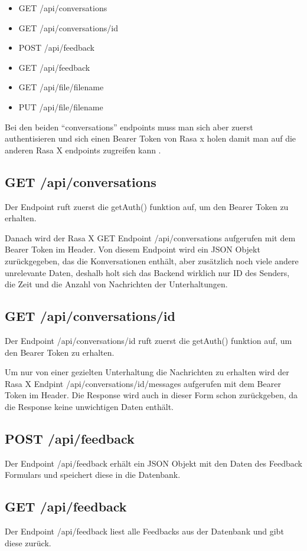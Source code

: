 \begin{itemize}
    \item GET /api/conversations
    \item GET /api/conversations/{id}
    \item POST /api/feedback
    \item GET /api/feedback
    \item GET /api/file/{filename}
    \item PUT /api/file/{filename}
\end{itemize}

Bei den beiden ``conversations'' endpoints muss man sich aber zuerst authentisieren und sich einen Bearer Token von Rasa x holen damit man auf die anderen Rasa X endpoints zugreifen kann .

\subsection{GET /api/conversations}
Der Endpoint ruft zuerst die getAuth() funktion auf, um den Bearer Token zu erhalten.

Danach wird der Rasa X GET Endpoint /api/conversations aufgerufen mit dem Bearer Token im Header.
Von diesem Endpoint wird ein JSON Objekt zurückgegeben, das die Konversationen enthält, aber zusätzlich noch viele andere unrelevante Daten, deshalb holt sich das Backend wirklich nur ID des Senders, die Zeit und die Anzahl von Nachrichten der Unterhaltungen.

\subsection{GET /api/conversations/{id}}
Der Endpoint /api/conversations/{id} ruft zuerst die getAuth() funktion auf, um den Bearer Token zu erhalten.

Um nur von einer gezielten Unterhaltung die Nachrichten zu erhalten wird der Rasa X Endpint /api/conversations/{id}/messages aufgerufen mit dem Bearer Token im Header.
Die Response wird auch in dieser Form schon zurückgeben, da die Response keine unwichtigen Daten enthält.

\subsection{POST /api/feedback}
Der Endpoint /api/feedback erhält ein JSON Objekt mit den Daten des Feedback Formulars und speichert diese in die Datenbank.

\subsection{GET /api/feedback}
Der Endpoint /api/feedback liest alle Feedbacks aus der Datenbank und gibt diese zurück.

